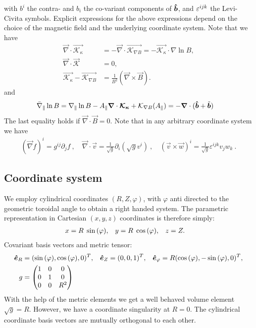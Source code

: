 with $b^i$ the contra- and $b_i$ the co-variant components of $\bm{\hat{b}}$, and 
$\varepsilon^{ijk}$ the Levi-Civita symbols.
Explicit expressions for the above expressions
depend on the choice of the magnetic field and the underlying coordinate system.
    Note that we have
\begin{align}
    \vec \nabla \cdot \vec{\mathcal K_\kappa}
    &= -\vec\nabla \cdot \vec{\mathcal K_{\nabla B}} = -\vec{ \mathcal K_\kappa}\cdot\nabla\ln B, \\
    \vec\nabla\cdot\vec{ \mathcal K} &= 0, \\
    \vec{ \mathcal K_\kappa} - \vec{ \mathcal K_{\nabla B}} &= \frac{1}{B^2} (\vec \nabla \times \vec B).
    \label{eq:curl_curvature}
\end{align}
and
\begin{align}
\bar\nabla_\parallel \ln B &= \nabla_\parallel \ln B - A_\parallel {\boldsymbol{\nabla}}\cdot{\boldsymbol{ \mathcal{ K_\kappa}}} + \mathcal K_{\nabla B}(A_\parallel) = -{\boldsymbol{\nabla}}\cdot(\bm{\hat{b}} + \tilde{{\boldsymbol{b}}})
\end{align}
The last equality holds if $\vec\nabla\cdot \vec B = 0$.
Note that in any arbitrary coordinate system we have
\begin{align}
(\vec \nabla f)^i = g^{ij}\partial_j f ~, \quad
\vec \nabla \cdot \vec v = \frac{1}{\sqrt{g}}\partial_i \left(\sqrt{g} v^i\right) ~, \quad
(\vec v \times \vec w)^i = \frac{1}{\sqrt{g}}\varepsilon^{ijk} v_jw_k ~.
\end{align}

\subsection{Coordinate system}\label{sec:cylmetric}
We employ cylindrical coordinates \( (R,Z,\varphi) \), with \(\varphi\) anti directed to the geometric toroidal angle to
obtain a right handed system. The parametric representation in Cartesian \((x,y,z)\) coordinates is therefore simply:
\begin{align}
 x &= R \hspace{1 mm} \sin{(\varphi)}, &
 y &= R \hspace{1 mm} \cos{(\varphi)}, &
 z &= Z .
\end{align}
Covariant
basis vectors and metric tensor:
\begin{align}
 \bm{\hat{e}}_R      &= (\sin{(\varphi)} ,   \cos{(\varphi)},0)^T, &
 \bm{\hat{e}}_Z      &= ( 0 ,0 ,1 )^T, &
 \bm{\hat{e}}_{\varphi} &= R ( \cos{(\varphi)} , -\sin{(\varphi)} , 0 )^T,
\\
 g &= \begin{pmatrix}
  1 & 0 & 0 \\
  0 & 1 & 0 \\
  0 & 0 & R^2
   \end{pmatrix}
\end{align}
With the help of the metric elements we get a well behaved volume element \(\sqrt{g} = R\). However, we have a coordinate singularity at \(R=0\).
The cylindrical coordinate basis vectors are mutually orthogonal to each other.

